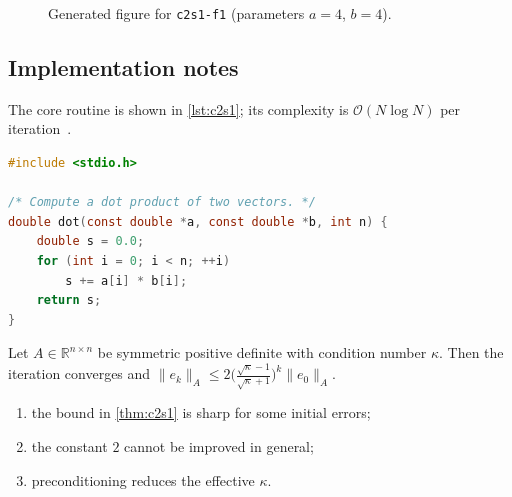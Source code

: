 \begin{figure}[htbp]
\centering
{}
\caption{Generated figure for \texttt{c2s1-f1} (parameters $a=4$, $b=4$).}\label{fig:c2s1-f1}
\end{figure}

\kant[6-12]

\subsection{Implementation notes}\label{sec:c2s1-i}
The core routine is shown in \cref{lst:c2s1}; its complexity is $\mathcal{O}(N\log N)$ per iteration~\cite{ch2-3}.

\begin{lstlisting}[language=c,caption={Reference implementation for c2s1.},label={lst:c2s1}]
#include <stdio.h>

/* Compute a dot product of two vectors. */
double dot(const double *a, const double *b, int n) {
    double s = 0.0;
    for (int i = 0; i < n; ++i)
        s += a[i] * b[i];
    return s;
}
\end{lstlisting}

\lipsum[91-91]
\begin{theorem}\label{thm:c2s1}
Let $A\in\mathbb{R}^{n\times n}$ be symmetric positive definite with condition number $\kappa$. Then the iteration converges and
$\lVert e_k\rVert_A \le 2\bigl(\tfrac{\sqrt\kappa-1}{\sqrt\kappa+1}\bigr)^k\lVert e_0\rVert_A$.
\end{theorem}
\begin{enumerate}[label=(\roman*)]
\item the bound in \cref{thm:c2s1} is sharp for some initial errors;
\item the constant $2$ cannot be improved in general;
\item preconditioning reduces the effective $\kappa$.
\end{enumerate}

